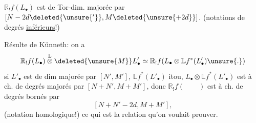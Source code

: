 $\mathbb R_!f(L_\bullet)$ est de Tor-dim. majorée par
$[N-2d\deleted{\unsure{'}},M\deleted{\unsure{+2d}}]$. (notations  de degrés \uline{inférieurs}!)

Résulte  de Künneth: on a
\[
\mathbb R_!f(L_\bullet)\overset{\mathbb L}{\otimes}\deleted{\unsure{M}}L'_\bullet\simeq\mathbb R_!f(L_\bullet\otimes\mathbb Lf^*(L'_\bullet)\unsure{.})
\]
si
$L'_\bullet$ est de  dim majorée par $[N',M']$,
$\mathbb Lf^*(L'_\bullet)$ itou, $L_\bullet\otimes\mathbb Lf^*(L'_\bullet)$ est à ch. de
degrés majorés par $[N+N',M+M']$, donc
$\mathbb R_!f(\qquad)$ est à ch. de degrés bornés par
\[
[N+N'-2d,M+M'],
\]
(notation homologique!)
ce qui est la relation qu'on voulait prouver.

